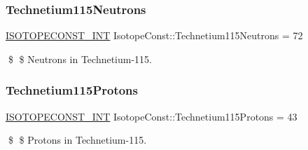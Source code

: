 \subsubsection{\texorpdfstring{Technetium115\+Neutrons}{Technetium115Neutrons}}
{\footnotesize\ttfamily \mbox{\hyperlink{group___isotope_const-_macros_ga5f18360b3e99483a35c32d789e62621c}{I\+S\+O\+T\+O\+P\+E\+C\+O\+N\+S\+T\+\_\+\+I\+NT}} Isotope\+Const\+::\+Technetium115\+Neutrons = 72}

\$ \$ Neutrons in Technetium-\/115. \mbox{\label{group___isotope_const-_technetium-_tc115_ga78d9b04b8e5ffdc5a5f856dbb1a304ee}} 
\subsubsection{\texorpdfstring{Technetium115\+Protons}{Technetium115Protons}}
{\footnotesize\ttfamily \mbox{\hyperlink{group___isotope_const-_macros_ga5f18360b3e99483a35c32d789e62621c}{I\+S\+O\+T\+O\+P\+E\+C\+O\+N\+S\+T\+\_\+\+I\+NT}} Isotope\+Const\+::\+Technetium115\+Protons = 43}

\$ \$ Protons in Technetium-\/115. 